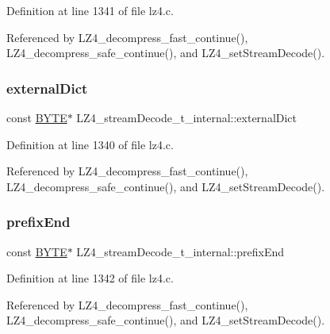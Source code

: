 Definition at line 1341 of file lz4.\+c.



Referenced by L\+Z4\+\_\+decompress\+\_\+fast\+\_\+continue(), L\+Z4\+\_\+decompress\+\_\+safe\+\_\+continue(), and L\+Z4\+\_\+set\+Stream\+Decode().

\mbox{\label{structLZ4__streamDecode__t__internal_a0edc5a25f4e1e84e48c1a60900dabd4f}} 
\subsubsection{\texorpdfstring{external\+Dict}{externalDict}}
{\footnotesize\ttfamily const \hyperlink{lz4_8c_a4ae1dab0fb4b072a66584546209e7d58}{B\+Y\+TE}$\ast$ L\+Z4\+\_\+stream\+Decode\+\_\+t\+\_\+internal\+::external\+Dict}



Definition at line 1340 of file lz4.\+c.



Referenced by L\+Z4\+\_\+decompress\+\_\+fast\+\_\+continue(), L\+Z4\+\_\+decompress\+\_\+safe\+\_\+continue(), and L\+Z4\+\_\+set\+Stream\+Decode().

\mbox{\label{structLZ4__streamDecode__t__internal_ae54ddf8eaf34cbc8919fb0dea3a5cb60}} 
\subsubsection{\texorpdfstring{prefix\+End}{prefixEnd}}
{\footnotesize\ttfamily const \hyperlink{lz4_8c_a4ae1dab0fb4b072a66584546209e7d58}{B\+Y\+TE}$\ast$ L\+Z4\+\_\+stream\+Decode\+\_\+t\+\_\+internal\+::prefix\+End}



Definition at line 1342 of file lz4.\+c.



Referenced by L\+Z4\+\_\+decompress\+\_\+fast\+\_\+continue(), L\+Z4\+\_\+decompress\+\_\+safe\+\_\+continue(), and L\+Z4\+\_\+set\+Stream\+Decode().

